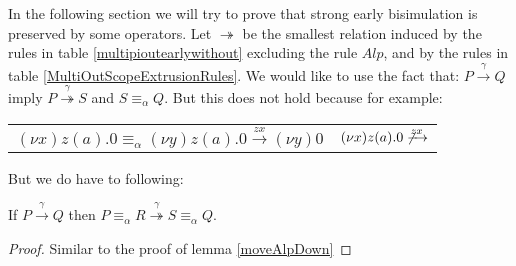 


In the following section we will try to prove that strong early bisimulation is preserved by some operators. Let $\twoheadrightarrow$ be the smallest relation induced by the rules in table \ref{multipioutearlywithout} excluding the rule $Alp$, and by the rules in table \ref{MultiOutScopeExtrusionRules}. We would like to use the fact that: $P \xrightarrow{\gamma} Q$ imply $P \stackrel{\gamma}{\twoheadrightarrow} S$ and $S\equiv_{\alpha} Q$. But this does not hold because for example:
\begin{center}
  \begin{tabular}{ll}
      $(\nu x) z(a).0 \equiv_{\alpha} (\nu y) z(a).0 \xrightarrow{zx} (\nu y)0$
    &
      $(\nu x) z(a).0 \not \xrightarrow{zx} $
  \end{tabular}
\end{center}

But we do have to following:
\begin{lemma}\label{multipiOutMoveAlpDown}
  If $P \xrightarrow{\gamma} Q$ then $P\equiv_{\alpha}R \stackrel{\gamma}{\twoheadrightarrow} S\equiv_{\alpha}Q$.
  \begin{proof}
    Similar to the proof of lemma \ref{moveAlpDown}
  \end{proof}
\end{lemma}


